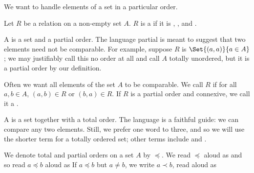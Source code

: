 \sbasic



\sstart



We want to handle elements of a set in a particular order.


Let $R$ be a relation on a non-empty set $A$.
$R$ is a  if it is
, ,
and .

A  is a set
and a partial order.
The language partial is meant to suggest that two elements
need not be comparable.
For example, suppose $R$ is $\Set{(a,a)}{a \in A}$;
we may justifiably call this no order at all and
call $A$ totally unordered, but it is a partial order
by our definition.

Often we want all elements of the set $A$ to be comparable.
We call $R$  if for all
$a, b \in A$, $(a, b) \in R$ or $(b, a) \in R$.
If $R$ is a partial order and connexive,
we call it a .

A  is a set
together with a total order.
The language is a faithful guide: we can compare any
two elements.
Still, we prefer one word to three, and so we will use
the shorter term  for a
totally ordered set; other terms include
 and
.

We denote total and partial orders on a set $A$ by $\preceq$.
We read $\preceq$ aloud as  and so read $a\preceq b$ aloud as 
If $a \preceq b$ but $a \neq b$, we write $a \prec b$, read aloud as 


\strats
